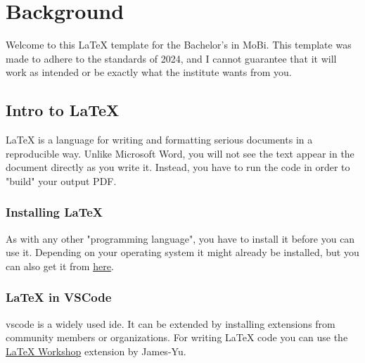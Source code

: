 \section{Background}
Welcome to this LaTeX template for the Bachelor's in MoBi. This template was made to adhere to the standards of 2024, and I cannot guarantee that it will work as intended or be exactly what the institute wants from you.
\subsection{Intro to LaTeX}
LaTeX is a language for writing and formatting serious documents in a reproducible way. Unlike Microsoft Word, you will not see the text appear in the document directly as you write it. Instead, you have to run the code in order to "build" your output PDF.
\subsubsection{Installing LaTeX}
As with any other "programming language", you have to install it before you can use it. Depending on your operating system it might already be installed, but you can also get it from \href{https://www.latex-project.org/get/#tex-distributions}{here}.
\subsubsection{LaTeX in VSCode}
\Ac{vscode} is a widely used \ac{ide}. It can be extended by installing extensions from community members or organizations. For writing LaTeX code you can use the \href{https://open-vsx.org/vscode/item?itemName=James-Yu.latex-workshop}{LaTeX Workshop} extension by James-Yu.
